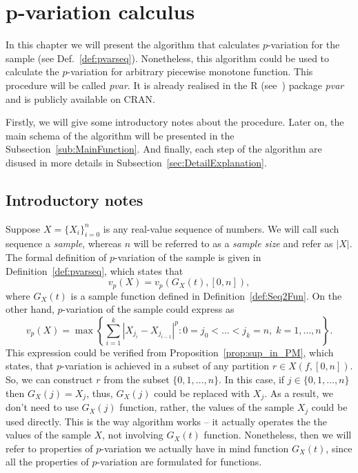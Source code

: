 \documentclass[12pt, a4paper]{article}
\numberwithin{equation}{section}
\begin{document}
\section{p-variation calculus}  
\label{sec:pvarcalc}  
  
In this chapter we will present the algorithm that calculates 
$p$-variation for the sample (see Def.~\ref{def:pvarseq}). 
Nonetheless, this algorithm could be used to calculate
the $p$-variation for arbitrary piecewise monotone function. 
This procedure will be called \emph{pvar}. 
It is already realised in the R (see~\cite{R}) package \emph{pvar} and
is publicly available on CRAN\footnotemark.

Firstly, we will give some introductory notes about the
procedure. Later on, the main schema of the
algorithm will be presented in the
Subsection~\ref{sub:MainFunction}. And finally, 
each step of the algorithm are disused in more details in 
Subsection~\ref{sec:DetailExplanation}.

\subsection{Introductory notes}


Suppose $X=\{X_{i}\}_{i=0}^{n}$ is any real-value sequence of numbers. 
We will call such sequence a \emph{sample}, 
whereas $n$ will be referred to as a \emph{sample size}
and refer as $|X|$.
The formal definition of $p$-variation 
of the sample is given in Definition~\ref{def:pvarseq}, 
which states that
\begin{equation}
  v_p(X) = v_p(G_X(t),[0,n]),
\end{equation}
where $G_X(t)$ is a sample function defined in  
Definition~\ref{def:Seq2Fun}.
On the other hand, 
$p$-variation of the sample could express as
\begin{equation}
  v_p(X) = \max\left\{ \sum_{i=1}^k |X_{j_i} - X_{j_{i-1}}|^p :
  0=j_0<\dots<j_k=n,\; k=1,\dots,n  \right\}.
\end{equation}
This expression could be verified from
Proposition~\ref{prop:sup_in_PM},
which states, that $p$-variation
is achieved in a subset of any partition $r \in X(f, [0,n])$.
So, we can construct $r$ from the subset $\{0, 1, \dots, n\}$. 
In this case, if $j \in \{0, 1, \dots, n\}$ then $G_X(j) = X_j$, thus,
$G_X(j)$ could be replaced with $X_j$. As a result,
we don't need to use $G_X(j)$ function, rather, 
the values of the sample $X_j$ could be used directly. 
This is the way algorithm works --
it actually operates the the values of the sample $X$,
not involving $G_X(t)$ function. Nonetheless,
then we will refer to properties of $p$-variation
we actually have in mind function $G_X(t)$, since all
the properties of $p$-variation are formulated for functions.
\end{document}
